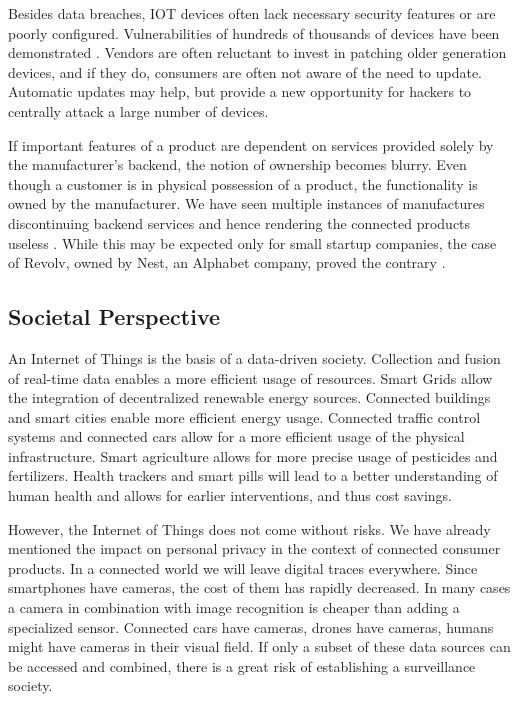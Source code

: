 Besides data breaches, \ac{IOT} devices often lack necessary security features or are poorly configured. Vulnerabilities of hundreds of thousands of devices have been demonstrated \parencite{7546527,Bodenheim2014114,184449,garcia2016lock}. Vendors are often reluctant to invest in patching older generation devices, and if they do, consumers are often not aware of the need to update. Automatic updates may help, but provide a new opportunity for hackers to centrally attack a large number of devices.

If important features of a product are dependent on services provided solely by the manufacturer's backend, the notion of ownership becomes blurry. Even though a customer is in physical possession of a product, the functionality is owned by the manufacturer. We have seen multiple instances of manufactures discontinuing backend services and hence rendering the connected products useless \parencite{Cox2016}. While this may be expected only for small startup companies, the case of Revolv, owned by Nest, an Alphabet company, proved the contrary \parencite{Gilbert2016}.


\subsection{Societal Perspective}

An Internet of Things is the basis of a data-driven society. Collection and fusion of real-time data enables a more efficient usage of resources. Smart Grids allow the integration of decentralized renewable energy sources. Connected buildings and smart cities enable more efficient energy usage. Connected traffic control systems and connected cars allow for a more efficient usage of the physical infrastructure. Smart agriculture allows for more precise usage of pesticides and fertilizers. Health trackers and smart pills will lead to a better understanding of human health and allows for earlier interventions, and thus cost savings. 

However, the Internet of Things does not come without risks. We have already mentioned the impact on personal privacy in the context of connected consumer products. In a connected world we will leave digital traces everywhere. Since smartphones have cameras, the cost of them has rapidly decreased. In many cases a camera in combination with image recognition is cheaper than adding a specialized sensor. Connected cars have cameras, drones have cameras, humans might have cameras in their visual field. If only a subset of these data sources can be accessed and combined, there is a great risk of establishing a surveillance society. 

